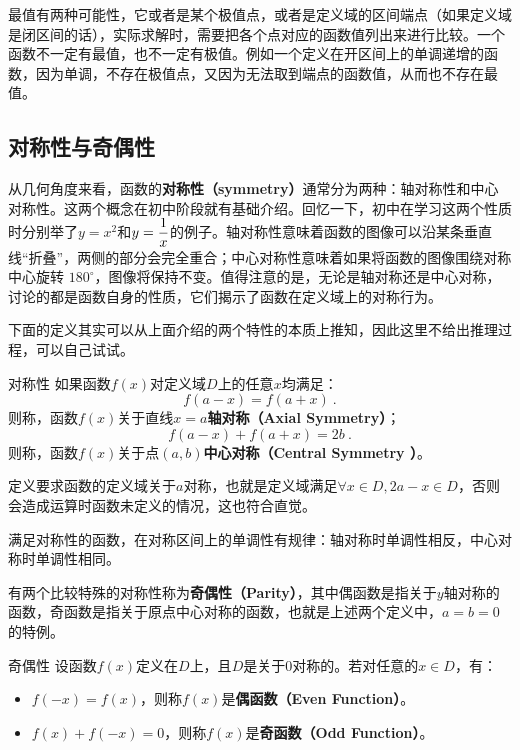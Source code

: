 最值有两种可能性，它或者是某个极值点，或者是定义域的区间端点（如果定义域是闭区间的话），实际求解时，需要把各个点对应的函数值列出来进行比较。一个函数不一定有最值，也不一定有极值。例如一个定义在开区间上的单调递增的函数，因为单调，不存在极值点，又因为无法取到端点的函数值，从而也不存在最值。

\subsection{对称性与奇偶性}

从几何角度来看，函数的\textbf{对称性（symmetry）}通常分为两种：轴对称性和中心对称性。这两个概念在初中阶段就有基础介绍。回忆一下，初中在学习这两个性质时分别举了$y=x^2$和$\displaystyle y={1\over x}$的例子。轴对称性意味着函数的图像可以沿某条垂直线“折叠”，两侧的部分会完全重合；中心对称性意味着如果将函数的图像围绕对称中心旋转 $180^\circ$，图像将保持不变。值得注意的是，无论是轴对称还是中心对称，讨论的都是函数自身的性质，它们揭示了函数在定义域上的对称行为。

下面的定义其实可以从上面介绍的两个特性的本质上推知，因此这里不给出推理过程，可以自己试试。

\begin{definition}{对称性}
如果函数$f(x)$对定义域$D$上的任意$x$均满足：
\begin{equation}
f(a-x)=f(a+x)~.
\end{equation}
则称，函数$f(x)$关于直线$x=a$\textbf{轴对称（Axial Symmetry）}；
\begin{equation}
f(a-x)+f(a+x)=2b~.
\end{equation}
则称，函数$f(x)$关于点$(a,b)$\textbf{中心对称（Central Symmetry ）}。
\end{definition}

定义要求函数的定义域关于$a$对称，也就是定义域满足$\forall x\in D,2a-x\in D$，否则会造成运算时函数未定义的情况，这也符合直觉。

满足对称性的函数，在对称区间上的单调性有规律：轴对称时单调性相反，中心对称时单调性相同。

有两个比较特殊的对称性称为\textbf{奇偶性（Parity）}，其中偶函数是指关于$y$轴对称的函数，奇函数是指关于原点中心对称的函数，也就是上述两个定义中，$a=b=0$的特例。

\begin{definition}{奇偶性}
设函数$f(x)$定义在$D$上，且$D$是关于$0$对称的。若对任意的$x\in D$，有：
\begin{itemize}
\item $f(-x)=f(x)$，则称$f(x)$是\textbf{偶函数（Even Function）}。
\item $f(x)+f(-x)=0$，则称$f(x)$是\textbf{奇函数（Odd Function）}。
\end{itemize}
\end{definition}

